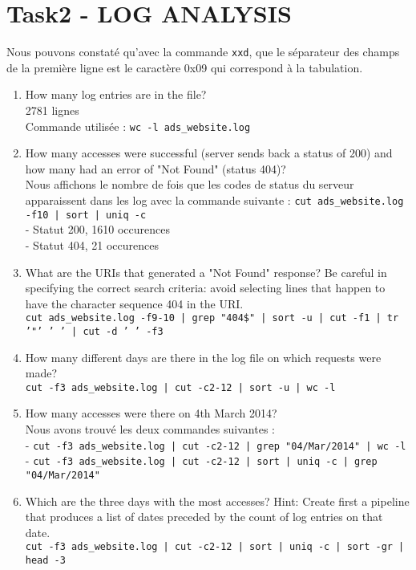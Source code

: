 \documentclass[a4paper,11pt]{article}
\newcounter{commande}[subsection]
\begin{document}
\section{Task2 - LOG ANALYSIS}
Nous pouvons constaté qu'avec la commande \texttt{xxd}, que le séparateur des champs de la première ligne est le caractère 0x09 qui correspond à la tabulation.
\\
\begin{enumerate}
  \item How many log entries are in the file?\\ 2781 lignes \\Commande utilisée : \texttt{wc -l ads\_website.log}
  \item How many accesses were successful (server sends back a status of 200) and how many had an error of "Not Found" (status 404)?\\
  Nous affichons le nombre de fois que les codes de status du serveur apparaissent dans les log avec la commande suivante : \texttt{cut ads\_website.log -f10 | sort | uniq -c}\\
  - Statut 200, 1610 occurences\\
  - Statut 404, 21 occurences
  
  \item What are the URIs that generated a "Not Found" response? Be careful in specifying the correct search criteria: avoid selecting lines that happen to have the character sequence 404 in the URI.\\
  \texttt{cut ads\_website.log -f9-10 | grep "404\$" | sort -u | cut -f1 | tr '"' ' ' | cut -d ' ' -f3}\\
  
  
  \item How many different days are there in the log file on which requests were made?\\
  \texttt{cut -f3 ads\_website.log | cut -c2-12 | sort -u | wc -l}
  
  \item How many accesses were there on 4th March 2014? \\Nous avons trouvé les deux commandes suivantes : \\
  - \texttt{cut -f3 ads\_website.log | cut -c2-12 | grep "04/Mar/2014" | wc -l}\\
  - \texttt{cut -f3 ads\_website.log | cut -c2-12 | sort | uniq -c | grep "04/Mar/2014"}
  
  \item Which are the three days with the most accesses? Hint: Create first a pipeline that produces a list of dates preceded by the count of log entries on that date.\\
  \texttt{cut -f3 ads\_website.log | cut -c2-12 | sort | uniq -c | sort -gr | head -3}
  

\end{enumerate}
\end{document}
